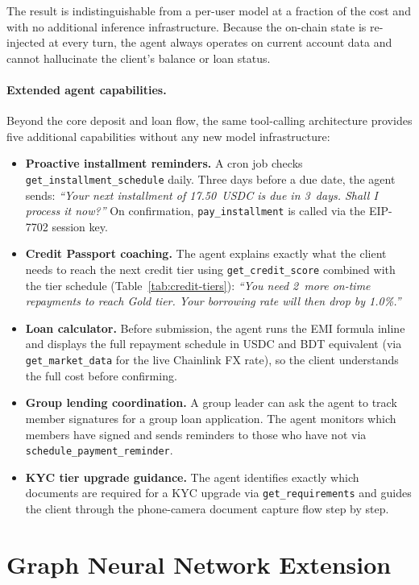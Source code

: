 \documentclass[12pt,a4paper]{report}
\begin{document}
\noindent The result is indistinguishable from a per-user model at a fraction of the cost and with no additional inference infrastructure. Because the on-chain state is re-injected at every turn, the agent always operates on current account data and cannot hallucinate the client's balance or loan status.

\paragraph{Extended agent capabilities.}

Beyond the core deposit and loan flow, the same tool-calling architecture provides five additional capabilities without any new model infrastructure:

\begin{itemize}[noitemsep]
\item \textbf{Proactive installment reminders.} A cron job checks \texttt{get\_installment\_schedule} daily. Three days before a due date, the agent sends: \emph{``Your next installment of 17.50~USDC is due in 3~days. Shall I process it now?''} On confirmation, \texttt{pay\_installment} is called via the EIP-7702 session key.
\item \textbf{Credit Passport coaching.} The agent explains exactly what the client needs to reach the next credit tier using \texttt{get\_credit\_score} combined with the tier schedule (Table~\ref{tab:credit-tiers}): \emph{``You need 2~more on-time repayments to reach Gold tier. Your borrowing rate will then drop by 1.0\%.''}
\item \textbf{Loan calculator.} Before submission, the agent runs the EMI formula inline and displays the full repayment schedule in USDC and BDT equivalent (via \texttt{get\_market\_data} for the live Chainlink FX rate), so the client understands the full cost before confirming.
\item \textbf{Group lending coordination.} A group leader can ask the agent to track member signatures for a group loan application. The agent monitors which members have signed and sends reminders to those who have not via \texttt{schedule\_payment\_reminder}.
\item \textbf{KYC tier upgrade guidance.} The agent identifies exactly which documents are required for a KYC upgrade via \texttt{get\_requirements} and guides the client through the phone-camera document capture flow step by step.
\end{itemize}

\section{Graph Neural Network Extension}
\label{sec:gnn-extension}
\end{document}
